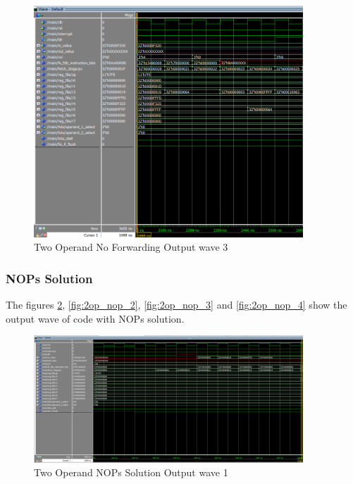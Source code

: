 \begin{figure}[H]
    \centering
    \includegraphics[width=0.9\textwidth]{images/test_cases/two_operand/TwoOperand_no_forward_3.PNG}
    \caption{Two Operand No Forwarding Output wave 3}
    \label{fig:2op_no_3}
\end{figure}

\subsubsection{NOPs Solution}
The figures \ref{fig:2op_nop_1}, \ref{fig:2op_nop_2}, \ref{fig:2op_nop_3} and \ref{fig:2op_nop_4} show the output wave of code with NOPs solution.
\begin{figure}[H]
    \centering
    \includegraphics[width=0.9\textwidth]{images/test_cases/two_operand/TwoOperand_NOP_1.PNG}
    \caption{Two Operand NOPs Solution Output wave 1}
    \label{fig:2op_nop_1}
\end{figure}

